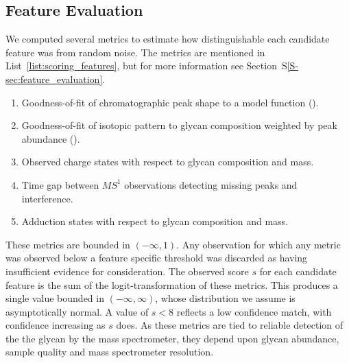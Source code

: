 \subsection{Feature Evaluation}
    We computed several metrics to estimate
    how distinguishable each candidate feature was from random noise. The
    metrics are mentioned in List~\ref{list:scoring_features}, but for more
    information see Section~S\ref{S-sec:feature_evaluation}.
    \begin{ordlist}
    \begin{enumerate}
        \itemsep0em
        \caption{Chromatographic Feature Metrics\label{list:scoring_features}}
        \item Goodness-of-fit of chromatographic peak shape to a model function
              (\cite{Yu2010,Kronewitter2014}).
        \item Goodness-of-fit of isotopic pattern to glycan composition weighted
              by peak abundance (\cite{Maxwell2012}).
        \item Observed charge states with respect to glycan composition and mass.
        \item Time gap between $MS^1$ observations detecting missing peaks
              and interference.
        \item Adduction states with respect to glycan composition and mass.
    \end{enumerate}
    \end{ordlist}

    These metrics are bounded in $(-\infty, 1)$. Any observation for which any metric
    was observed below a feature specific threshold was discarded as having insufficient
    evidence for consideration. The observed score $s$ for each candidate feature is
    the sum of the logit-transformation of these metrics. This produces a single
    value bounded in $(-\infty, \infty)$, whose distribution we assume is asymptotically
    normal. A value of $s < 8$ reflects a low confidence match, with confidence increasing
    as $s$ does. As these metrics are tied to reliable detection of the the glycan
    by the mass spectrometer, they depend upon glycan abundance, sample quality and
    mass spectrometer resolution.
